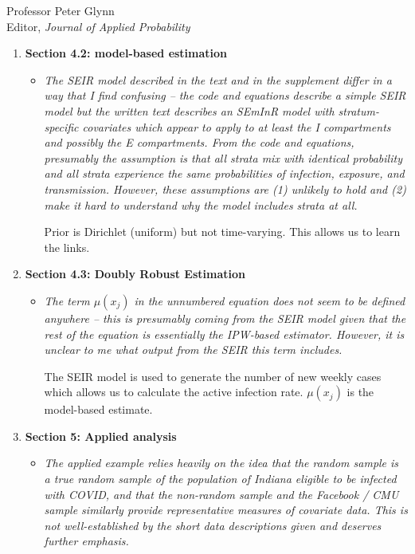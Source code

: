 \documentclass[11pt]{letter} %
\begin{document}
\begin{letter}{Professor
	Peter Glynn\\
	Editor, {\em Journal of Applied Probability}}
\begin{enumerate}
\begin{itemize}
	Necessary for smoothing.
	\vspace{5mm}
\end{itemize}
\item {\bf Section 4.2: model-based estimation}
\begin{itemize}
	\item {\it The SEIR model described in the text and in the supplement differ in a way that I find confusing – the code and equations describe a simple SEIR model but the written text describes an SEmInR model with stratum-specific covariates which appear to apply to at least the I compartments and possibly the E compartments. From the code and equations, presumably the assumption is that all strata mix with identical probability and all strata experience the same probabilities of infection, exposure, and transmission. However, these assumptions are (1) unlikely to hold and (2) make it hard to understand why the model includes strata at all. }
	\vspace{5mm}

	Prior is Dirichlet (uniform) but not time-varying.  This allows us to learn the links.
	\vspace{5mm}
\end{itemize}
\item {\bf Section 4.3: Doubly Robust Estimation}
\begin{itemize}
	\item {\it The term $\mu(x_j)$ in the unnumbered equation does not seem to be defined anywhere – this is presumably coming from the SEIR model given that the rest of the equation is essentially the IPW-based estimator. However, it is unclear to me what output from the SEIR this term includes.}
	\vspace{5mm}

	The SEIR model is used to generate the number of new weekly cases which allows us to calculate the active infection rate.  $\mu(x_j)$ is the model-based estimate.
	\vspace{5mm}
\end{itemize}
\item {\bf Section 5: Applied analysis}
\begin{itemize}
	\item {\it The applied example relies heavily on the idea that the random sample is a true random sample of the population of Indiana eligible to be infected with COVID, and that the non-random sample and the Facebook / CMU sample similarly provide representative measures of covariate data. This is not well-established by the short data descriptions given and deserves further emphasis.}
	\vspace{5mm}


\end{itemize}
\end{enumerate}
\end{letter}
\end{document}
